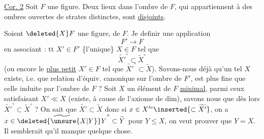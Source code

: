 \uline{Cor. 2} Soit $F$ une figure. Deux lieux dans  l'ombre de $F$, qui appartiennent à des ombres ouvertes de strates distinctes, sont \uline{disjoints}.

Soient $\deleted{X}F$ une figure,   de $F$. Je  definir une application
\[
 F'\longrightarrow F
\]
en associant : tt $X'\in F'$ \{l'unique\} $X\in F$ tel que
\[
 \widetilde{X'}^\circ\subset\widetilde X^\circ
\]
(ou encore le \uline{plus petit}  $X'\in F$ tel que $\widetilde{X'}^\circ\subset\widetilde X$). Savons-nous déjà qu'un tel $X$ existe, i.e. que  relation d'équiv. canonique sur l'ombre de $F'$, est plus fine que celle induite par l'ombre de $F$ ? Soit $X$ un élément de $F$ \uline{minimal}, parmi ceux satisfaisant $X'\ll X$ (existe, à cause de l'axiome de dim), savons nous que dès lors $\widetilde{X'}^\circ\subset\widetilde X^\circ$ ?  On sait que $\widetilde{X'}\subset\widetilde X$ donc si $x\in X'^\circ\inserted{\subset\widetilde{X'}}$, on a $x\in\widetilde{\deleted{\unsure{X|Y}}Y}^\circ\subset\widetilde Y$ pour $Y\leq X$, on veut prouver que $Y=X$. Il semblerait qu'il manque quelque chose.

